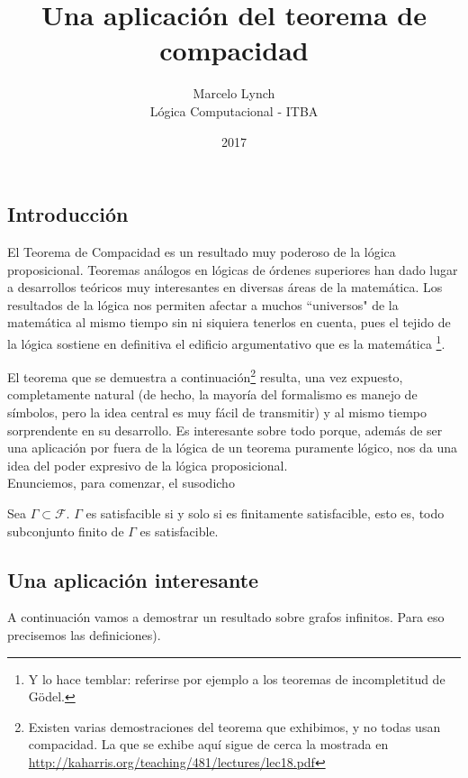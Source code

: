 \documentclass[12pt]{article}
\newenvironment{theorem}[2][Teorema]{\begin{trivlist}
\item[\hskip \labelsep {\bfseries #1}\hskip \labelsep {\bfseries #2}]}{\end{trivlist}}
\begin{document}
\title{Una aplicación del teorema de compacidad}
\author{ Marcelo Lynch \\ Lógica Computacional - ITBA }
\date{2017}

\maketitle

\subsection*{Introducción}
El Teorema de Compacidad es un resultado muy poderoso de la lógica proposicional. Teoremas análogos en lógicas de órdenes superiores han dado lugar a desarrollos teóricos muy interesantes en diversas áreas de la matemática. Los resultados de la lógica nos permiten afectar a muchos ``universos" de la matemática al mismo tiempo sin ni siquiera tenerlos en cuenta, pues el tejido de la lógica sostiene en definitiva el edificio argumentativo que es la matemática \footnote{Y lo hace temblar: referirse por ejemplo a los teoremas de incompletitud de Gödel.}.

El teorema que se demuestra a continuación\footnote{Existen varias demostraciones del teorema que exhibimos, y no todas usan compacidad. La que se exhibe aquí sigue de cerca la mostrada en \url{http://kaharris.org/teaching/481/lectures/lec18.pdf}} resulta, una vez expuesto, completamente natural (de hecho, la mayoría del formalismo es manejo de símbolos, pero la idea central es muy fácil de transmitir) y al mismo tiempo sorprendente en su desarrollo. Es interesante sobre todo porque, además de ser una aplicación por fuera de la lógica de un teorema puramente lógico, nos da una idea del poder expresivo de la lógica proposicional.\\

Enunciemos, para comenzar, el susodicho

\begin{theorem}{(de Compacidad).}
Sea $\Gamma \subset \mathcal{F}$. $\Gamma$ es satisfacible si y solo si es finitamente satisfacible, esto es, todo subconjunto finito de $\Gamma$ es satisfacible.
\end{theorem}


\subsection*{Una aplicación interesante}

A continuación vamos a demostrar un resultado sobre grafos infinitos. Para eso precisemos las definiciones).
\end{document}
